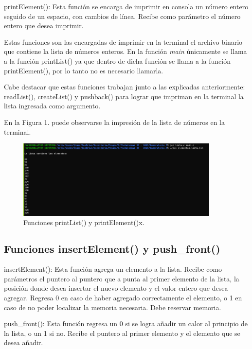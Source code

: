 \documentclass[12pt,a4paper]{article}
\begin{document}
printElement(): Esta función se encarga de imprimir en consola un número entero seguido de un espacio, con cambios de línea. Recibe como parámetro el número entero que desea imprimir.

Estas funciones son las encargadas de imprimir en la terminal el archivo binario que contiene la lista de números enteros. En la función \textit{main} únicamente se llama a la función printList() ya que dentro de dicha función se llama a la función printElement(), por lo tanto no es necesario llamarla.

Cabe destacar que estas funciones trabajan junto a las explicadas anteriormente: readList(), createList() y pushback() para lograr que impriman en la terminal la lista ingresada como argumento.
 
En la Figura 1. puede observarse la impresión de la lista de números en la terminal.



\begin{figure}[H]
    \centering
    \center
    \includegraphics[width=0.9\textwidth]{FotosLabo7/Figura1.png}
    \caption{Funciones printList() y printElement()x. \cite{cap}}
    \label{fig:createList}
\end{figure}



\subsection{Funciones insertElement() y push\_front()}

insertElement(): Esta función agrega un elemento a la lista. Recibe como parámetros el puntero al puntero que a punta al primer elemento de la lista, la posición donde desea insertar el nuevo elemento y el valor entero que desea agregar. Regresa 0 en caso de haber agregado correctamente el elemento, o 1 en caso de no poder localizar la memoria necesaria. Debe reservar memoria.

push\_front(): Esta función regresa un 0 si se logra añadir un calor al principio de la lista, o un 1 si no. Recibe el puntero al primer elemento y el elemento que se desea añadir.
\end{document}
